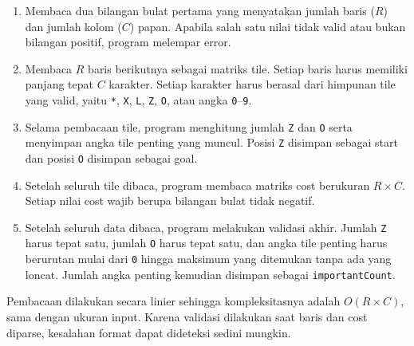 \documentclass[a4paper,11pt]{article}
\begin{document}
\begin{enumerate}
    \item Membaca dua bilangan bulat pertama yang menyatakan jumlah baris ($R$) dan jumlah kolom ($C$) papan. Apabila salah satu nilai tidak valid atau bukan bilangan positif, program melempar error.
    \item Membaca $R$ baris berikutnya sebagai matriks tile. Setiap baris harus memiliki panjang tepat $C$ karakter. Setiap karakter harus berasal dari himpunan tile yang valid, yaitu \texttt{*}, \texttt{X}, \texttt{L}, \texttt{Z}, \texttt{O}, atau angka \texttt{0}--\texttt{9}.
    \item Selama pembacaan tile, program menghitung jumlah \texttt{Z} dan \texttt{O} serta menyimpan angka tile penting yang muncul. Posisi \texttt{Z} disimpan sebagai start dan posisi \texttt{O} disimpan sebagai goal.
    \item Setelah seluruh tile dibaca, program membaca matriks cost berukuran $R \times C$. Setiap nilai cost wajib berupa bilangan bulat tidak negatif.
    \item Setelah seluruh data dibaca, program melakukan validasi akhir. Jumlah \texttt{Z} harus tepat satu, jumlah \texttt{O} harus tepat satu, dan angka tile penting harus berurutan mulai dari \texttt{0} hingga maksimum yang ditemukan tanpa ada yang loncat. Jumlah angka penting kemudian disimpan sebagai \texttt{importantCount}.
\end{enumerate}

Pembacaan dilakukan secara linier sehingga kompleksitasnya adalah $O(R \times C)$, sama dengan ukuran input. Karena validasi dilakukan saat baris dan cost diparse, kesalahan format dapat dideteksi sedini mungkin.
\end{document}
